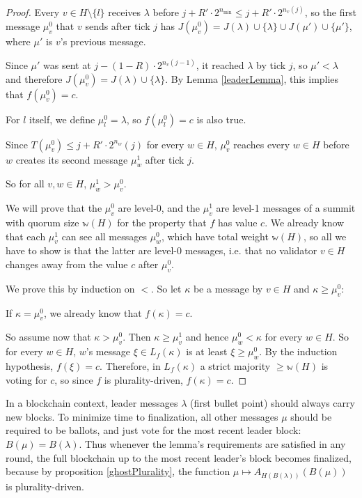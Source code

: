 \documentclass[12pt]{article}
\begin{document}
\begin{proof}
  Every $v \in H \setminus \{l\}$ receives $\lambda$ before $j + R' \cdot 2^{n_{\min}} \leq j + R' \cdot 2^{n_v(j)}$, so the first message $\mu^0_v$ that $v$ sends after tick $j$ has $J(\mu^0_v) = J(\lambda) \cup \{ \lambda \} \cup J(\mu') \cup \{ \mu' \}$, where $\mu'$ is $v$'s previous message.

  Since $\mu'$ was sent at $j - (1 - R) \cdot 2^{n_v(j - 1)}$, it reached $\lambda$ by tick $j$, so $\mu' < \lambda$ and therefore $J(\mu^0_v) = J(\lambda) \cup \{ \lambda \}$. By Lemma \ref{leaderLemma}, this implies that $f(\mu^0_v) = c$.

  For $l$ itself, we define $\mu^0_l = \lambda$, so $f(\mu^0_l) = c$ is also true.

  Since $T(\mu^0_v) \leq j + R' \cdot 2^{n_w}(j)$ for every $w \in H$, $\mu^0_v$ reaches every $w \in H$ before $w$ creates its second message $\mu^1_w$ after tick $j$.

  So for all $v, w \in H$, $\mu^1_w > \mu^0_v$.

  We will prove that the $\mu^0_v$ are level-0, and the $\mu^1_v$ are level-1 messages of a summit with quorum size $\mathbb{w}(H)$ for the property that $f$ has value $c$. We already know that each $\mu^1_v$ can see all messages $\mu^0_w$, which have total weight $\mathbb{w}(H)$, so all we have to show is that the latter are level-0 messages, i.e. that no validator $v \in H$ changes away from the value $c$ after $\mu^0_v$.

  We prove this by induction on $<$. So let $\kappa$ be a message by $v \in H$ and $\kappa \geq \mu^0_v$:

  If $\kappa = \mu^0_v$, we already know that $f(\kappa) = c$.

  So assume now that $\kappa > \mu^0_v$. Then $\kappa \geq \mu^1_v$ and hence $\mu^0_w < \kappa$ for every $w \in H$. So for every $w \in H$, $w$'s message $\xi \in L_f(\kappa)$ is at least $\xi \geq \mu^0_w$. By the induction hypothesis, $f(\xi) = c$. Therefore, in $L_f(\kappa)$ a strict majority $\geq \mathbb{w}(H)$ is voting for $c$, so since $f$ is plurality-driven, $f(\kappa) = c$.
\end{proof}

In a blockchain context, leader messages $\lambda$ (first bullet point) should always carry new blocks. To minimize time to finalization, all other messages $\mu$ should be required to be ballots, and just vote for the most recent leader block: $B(\mu) = B(\lambda)$. Thus whenever the lemma's requirements are satisfied in any round, the full blockchain up to the most recent leader's block becomes finalized, because by proposition \ref{ghostPlurality}, the function $\mu \mapsto A_{H(B(\lambda))}(B(\mu))$ is plurality-driven.
\end{document}
